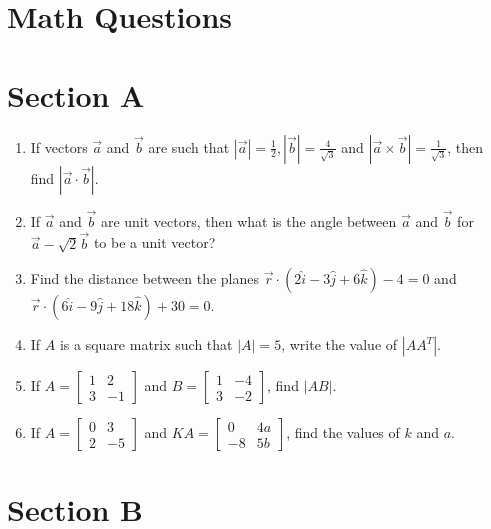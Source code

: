 \documentclass[12pt]{article}
\begin{document}
\section*{Math Questions}

\section*{Section A}

\begin{enumerate}
    \item If vectors $\vec{a}$ and $\vec{b}$ are such that $|\vec{a}|=\tfrac{1}{2}, |\vec{b}|=\tfrac{4}{\sqrt{3}}$ and $|\vec{a}\times \vec{b}|=\tfrac{1}{\sqrt{3}}$, then find $|\vec{a}\cdot \vec{b}|$.

    \item If $\vec{a}$ and $\vec{b}$ are unit vectors, then what is the angle between $\vec{a}$ and $\vec{b}$ for $\vec{a}-\sqrt{2}\vec{b}$ to be a unit vector?

    \item Find the distance between the planes $\vec{r}\cdot(2\hat{i}-3\hat{j}+6\hat{k})-4=0$ and $\vec{r}\cdot(6\hat{i}-9\hat{j}+18\hat{k})+30=0$.

    \item If $A$ is a square matrix such that $|A|=5$, write the value of $|AA^T|$.

    \item If $A=\begin{bmatrix}1 & 2 \\ 3 & -1\end{bmatrix}$ and $B=\begin{bmatrix}1 & -4 \\ 3 & -2\end{bmatrix}$, find $|AB|$.

    \item If $A=\begin{bmatrix}0 & 3 \\ 2 & -5\end{bmatrix}$ and $KA=\begin{bmatrix}0 & 4a \\ -8 & 5b\end{bmatrix}$, find the values of $k$ and $a$.
\end{enumerate}

\section*{Section B}
\end{document}
